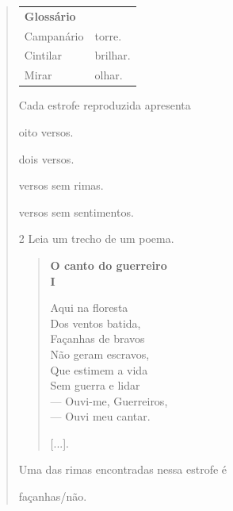 \begin{quote}
\begin{tabular}{ll}
\textbf{Glossário} & \mbox{}\\
Campanário & torre.\\
Cintilar & brilhar.\\
Mirar & olhar.
\end{tabular}

Cada estrofe reproduzida apresenta

\begin{minipage}{.5\textwidth}
\begin{escolha}
\item oito versos.

\item dois versos.

\item versos sem rimas.

\item versos sem sentimentos.
\end{escolha}
\end{minipage}

\num{2} Leia um trecho de um poema.

\begin{verse}
\textbf{O canto do guerreiro}\\
\textbf{I}

Aqui na floresta\\
Dos ventos batida,\\
Façanhas de bravos\\
Não geram escravos,\\
Que estimem a vida\\
Sem guerra e lidar\\
--- Ouvi-me, Guerreiros,\\
--- Ouvi meu cantar.

{[}...{]}.

\end{verse}

Uma das rimas encontradas nessa estrofe é

\begin{minipage}{.5\textwidth}
\begin{escolha}
\item façanhas/não.


\end{escolha}
\end{minipage}
\end{quote}
